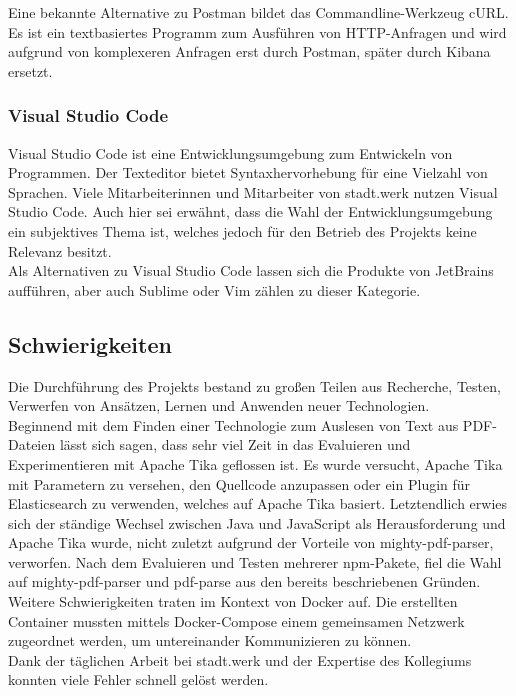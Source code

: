 \documentclass[a4paper]{scrartcl}
\begin{document}
Eine bekannte Alternative zu Postman bildet das Commandline-Werkzeug cURL. Es ist ein textbasiertes Programm zum Ausführen von HTTP-Anfragen und wird aufgrund von komplexeren Anfragen erst durch Postman, später durch Kibana ersetzt.

\subsubsection{Visual Studio Code}
Visual Studio Code ist eine Entwicklungsumgebung zum Entwickeln von Programmen. Der Texteditor bietet Syntaxhervorhebung für eine Vielzahl von Sprachen. Viele Mitarbeiterinnen und Mitarbeiter von stadt.werk nutzen Visual Studio Code. Auch hier sei erwähnt, dass die Wahl der Entwicklungsumgebung ein subjektives Thema ist, welches jedoch für den Betrieb des Projekts keine Relevanz besitzt. \\

Als Alternativen zu Visual Studio Code lassen sich die Produkte von JetBrains aufführen, aber auch Sublime oder Vim zählen zu dieser Kategorie.

\subsection{Schwierigkeiten}
Die Durchführung des Projekts bestand zu großen Teilen aus Recherche, Testen, Verwerfen von Ansätzen, Lernen und Anwenden neuer Technologien. \\
Beginnend mit dem Finden einer Technologie zum Auslesen von Text aus PDF-Dateien lässt sich sagen, dass sehr viel Zeit in das Evaluieren und Experimentieren mit Apache Tika geflossen ist. Es wurde versucht, Apache Tika mit Parametern zu versehen, den Quellcode anzupassen oder ein Plugin für Elasticsearch zu verwenden, welches auf Apache Tika basiert. Letztendlich erwies sich der ständige Wechsel zwischen Java und JavaScript als Herausforderung und Apache Tika wurde, nicht zuletzt aufgrund der Vorteile von mighty-pdf-parser, verworfen. Nach dem Evaluieren und Testen mehrerer npm-Pakete, fiel die Wahl auf mighty-pdf-parser und pdf-parse aus den bereits beschriebenen Gründen. \\
Weitere Schwierigkeiten traten im Kontext von Docker auf. Die erstellten Container mussten mittels Docker-Compose einem gemeinsamen Netzwerk zugeordnet werden, um untereinander Kommunizieren zu können. \\
Dank der täglichen Arbeit bei stadt.werk und der Expertise des Kollegiums konnten viele Fehler schnell gelöst werden.
    
\end{document}
